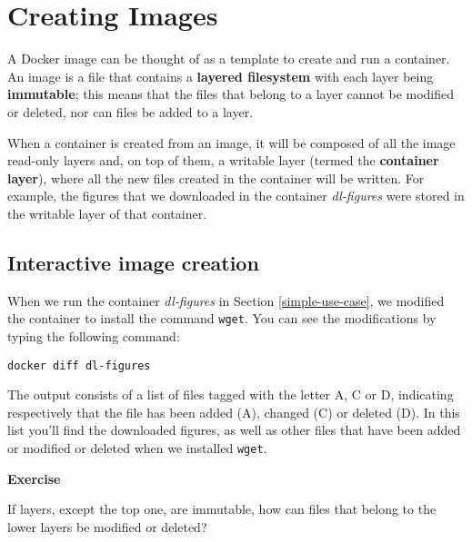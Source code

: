 \documentclass[
]{article}
\newenvironment{infobox}[1]
  {
  \begin{itemize}
  \renewcommand{\labelitemi}{
    \raisebox{-.7\height}[0pt][0pt]{
      
    }
  }
  \setlength{\fboxsep}{1em}
  \begin{whitebox}
  \item
  }
  {
  \end{whitebox}
  \end{itemize}
  }
\theoremstyle{definition}
\theoremstyle{definition}
\theoremstyle{definition}
\theoremstyle{remark}
\let\BeginKnitrBlock\begin \let\EndKnitrBlock\end
\begin{document}
\hypertarget{creating-images}{%
\section{Creating Images}\label{creating-images}}

A Docker image can be thought of as a template to create and run a container.
An image is a file that contains a \textbf{layered filesystem} with each layer being \textbf{immutable};
this means that the files that belong to a layer cannot be
modified or deleted, nor can files be added to a layer.

When a container is created from an image, it
will be composed of all the image read-only layers and, on top of
them, a writable layer (termed the \textbf{container layer}),
where all the new files created in the container will be written.
For example, the figures that we downloaded in the container
\emph{dl-figures} were stored in the writable layer of that container.

\hypertarget{interactive-image-creation}{%
\subsection{Interactive image creation}\label{interactive-image-creation}}

When we run the container \emph{dl-figures} in Section \ref{simple-use-case},
we modified the container to
install the command \texttt{wget}.
You can see the modifications by typing the
following command:

\begin{verbatim}
docker diff dl-figures
\end{verbatim}

The output consists of a list of files tagged with the letter A, C or D, indicating
respectively that the file has been added (A), changed (C) or deleted (D).
In this list you'll find the downloaded figures, as well as
other files that have been added or modified or deleted
when we installed \texttt{wget}.

\begin{infobox}{exercisebox}

\textbf{Exercise}

\BeginKnitrBlock{exercise}
\protect\hypertarget{exr:unnamed-chunk-12}{}{\label{exr:unnamed-chunk-12} }If layers, except the top one, are immutable,
how can files that belong to the lower layers be modified or deleted?
\EndKnitrBlock{exercise}

\end{infobox}
\end{document}
